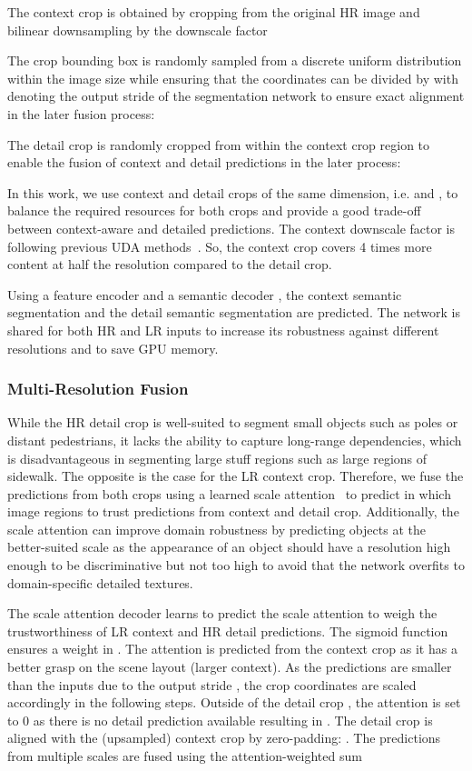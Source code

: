 \documentclass[journal,compsoc]{IEEEtran}
\begin{document}
The context crop  is obtained by cropping from the original HR image  and bilinear downsampling  by the downscale factor 

The crop bounding box  is randomly sampled from a discrete uniform distribution within the image size while ensuring that the coordinates can be divided by  with  denoting the output stride of the segmentation network to ensure exact alignment in the later fusion process:

The detail crop  is randomly cropped from within the context crop region to enable the fusion of context and detail predictions in the later process:

In this work, we use context and detail crops of the same dimension, i.e.  and , to balance the required resources for both crops and provide a good trade-off between context-aware and detailed predictions. The context downscale factor is  following previous UDA methods~\cite{tsai2018learning,tranheden2021dacs}. So, the context crop covers 4 times more content at half the resolution compared to the detail crop.

Using a feature encoder  and a semantic decoder , the context semantic segmentation  and the detail semantic segmentation  are predicted. 
The network is shared for both HR and LR inputs to increase its robustness against different resolutions and to save GPU memory.

\subsubsection{Multi-Resolution Fusion}
\label{sec:multi_resolution_uda}

While the HR detail crop is well-suited to segment small objects such as poles or distant pedestrians, it lacks the ability to capture long-range dependencies, which is disadvantageous in segmenting large stuff regions such as large regions of sidewalk. The opposite is the case for the LR context crop. Therefore, we fuse the predictions from both crops using a learned scale attention~\cite{chen2016attention} to predict in which image regions to trust predictions from context and detail crop. 
Additionally, the scale attention can improve domain robustness by predicting objects at the better-suited scale
as the appearance of an object should have a resolution high enough to be discriminative but not too high to avoid that the network overfits to domain-specific detailed textures.

The scale attention decoder  learns to predict the scale attention  to weigh the trustworthiness of LR context and HR detail predictions. The sigmoid function  ensures a weight in .
The attention is predicted from the context crop as it has a better grasp on the scene layout (larger context).
As the predictions are smaller than the inputs due to the output stride , the crop coordinates are scaled accordingly in the following steps. 
Outside of the detail crop , the attention is set to 0 as there is no detail prediction available resulting in .
The detail crop is aligned with the (upsampled) context crop by zero-padding: .
The predictions from multiple scales are fused using the attention-weighted sum
\end{document}
